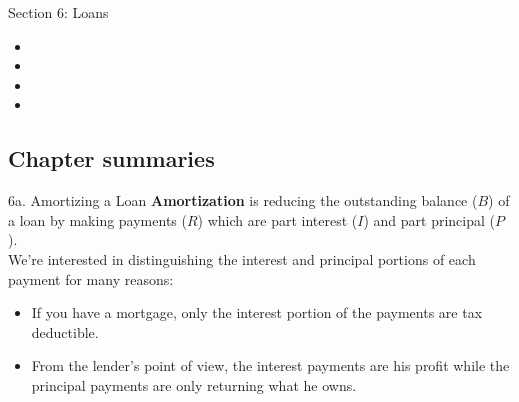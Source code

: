 \begin{ASM_chapter}
Section 6: Loans
\begin{itemize}[leftmargin = *]
	\item	{}
	\item	{}
	\item	{}
	\item	{}
\end{itemize}
\end{ASM_chapter}

\subsection{Chapter summaries}

\begin{CHPT_SUMM_AUTO}[label = {L.-6a}]{6a. Amortizing a Loan}
\textbf{Amortization} is reducing the outstanding balance ($B$) of a loan by making payments ($R$) which are part interest ($I$) and part principal ($P$).\\

We're interested in distinguishing the interest and principal portions of each payment for many reasons:
\begin{itemize}[leftmargin = *]
	\item	If you have a mortgage, only the interest portion of the payments are tax deductible. 
	\item	From the lender's point of view, the interest payments are his profit while the principal payments are only returning what he owns.
\end{itemize}


\end{CHPT_SUMM_AUTO}
